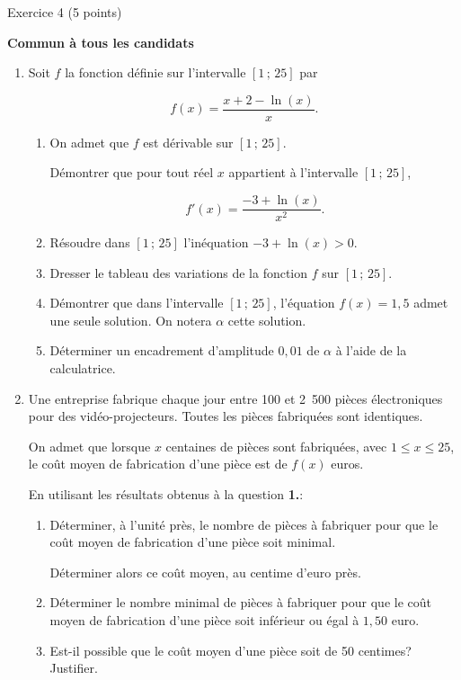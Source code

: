 
%
\begin{h2}Exercice 4 (5 points)\end{h2}
\textbf{Commun à tous les candidats}
\medskip
\begin{enumerate}
     \item Soit $f$ la fonction définie sur l'intervalle $[1\,;\,25]$ par
     \par
     \[f(x)=\dfrac{x+2-\ln(x)}{x}.\]
     \begin{enumerate}[label=\alph*.]
          \item  On admet que $f$ est dérivable sur $[1\,;\,25]$.
          \par
          Démontrer que pour tout réel $x$ appartient à l'intervalle $[1\,;\,25]$,
          \par
          \[f'(x)=\dfrac{-3+\ln(x)}{x^2}.\]
          \medskip
          \item Résoudre dans $[1\,;\,25]$ l'inéquation $-3+\ln(x)>0$.
          \item Dresser le tableau des variations de la fonction $f$ sur $[1\,;\,25]$.
          \item Démontrer que dans l'intervalle $[1\,;\,25]$, l'équation $f(x)=1,5$ admet une seule solution. On notera $\alpha$ cette solution.
          \item Déterminer un encadrement d'amplitude $0,01$ de $\alpha$ à l'aide de la calculatrice.
     \end{enumerate}
     \item Une entreprise fabrique chaque jour entre 100 et 2~500 pièces électroniques pour des vidéo-projecteurs. Toutes les pièces fabriquées sont identiques.
     \par
     On admet que lorsque $x$ centaines de pièces sont fabriquées, avec $1 \leqslant x \leqslant 25$, le coût moyen de fabrication d'une pièce est de $f(x)$ euros.
     \par
     En utilisant les résultats obtenus à la question \textbf{1.}:
     \begin{enumerate}[label=\alph*.]
          \item Déterminer, à l'unité près, le nombre de pièces à fabriquer pour que le coût moyen de fabrication d'une pièce soit minimal.
          \par
          Déterminer alors ce coût moyen, au centime d'euro près.
          \par
          \item Déterminer le nombre minimal de pièces à fabriquer pour que le coût moyen de fabrication d'une pièce soit inférieur ou égal à $1,50$ euro.
          \par
          \item Est-il possible que le coût moyen d'une pièce soit de 50 centimes? Justifier.
     \end{enumerate}
\end{enumerate}
